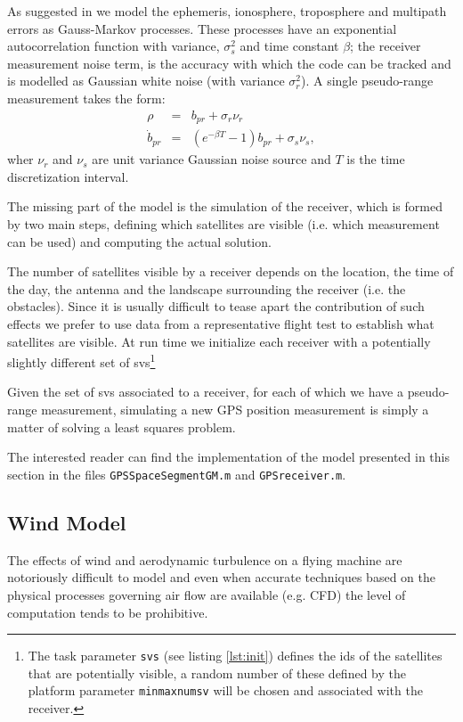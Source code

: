 \documentclass[a4paper,11pt]{report}
\begin{document}
As suggested in \cite{rankin1994anerror} we model the ephemeris, ionosphere, troposphere and multipath errors as Gauss-Markov processes. These processes have an exponential autocorrelation function with variance, $\sigma^2_s$ and time constant $\beta$; the receiver measurement noise term, is the accuracy with which the code can be tracked and is modelled as Gaussian white noise (with variance $\sigma^2_r$).
A single pseudo-range measurement takes the form:
\begin{eqnarray}
\rho & = & b_{pr} + \sigma_r\nu_{r}\\
\dot{b}_{pr} & = & (e^{-\beta T}-1) b_{pr} + \sigma_s\nu_{s},
\end{eqnarray}
wher $\nu_r$ and $\nu_s$ are unit variance Gaussian noise source and $T$ is the time discretization interval.  

The missing part of the model is the simulation of the receiver, which is formed by two main steps, defining which satellites are visible (i.e. which measurement can be used) and computing the actual solution.

The number of satellites visible by a receiver depends on the location, the time of the day, the antenna and the landscape surrounding the receiver (i.e. the obstacles). Since it is usually difficult to tease apart the contribution of such effects we prefer to use data from a representative flight test to establish what satellites are visible.
At run time we initialize each receiver with a potentially slightly different set of svs\footnote{The task parameter \texttt{svs} (see listing \ref{lst:init}) defines the ids of the satellites that are potentially visible, a random number of these defined by the platform parameter \texttt{minmaxnumsv} will be chosen and associated with the receiver.}

Given the set of svs associated to a receiver, for each of which we have a pseudo-range measurement, simulating a new GPS position measurement is simply a matter of solving a least squares problem. 

The interested reader can find the implementation of the model presented in this section in the files \texttt{GPSSpaceSegmentGM.m} and \texttt{GPSreceiver.m}.  

\subsection{Wind Model}

The effects of wind and aerodynamic turbulence on a flying machine are notoriously difficult to model and even when accurate techniques based on the physical processes governing air flow are available (e.g. CFD) the level of computation tends to be prohibitive.   
\end{document}
